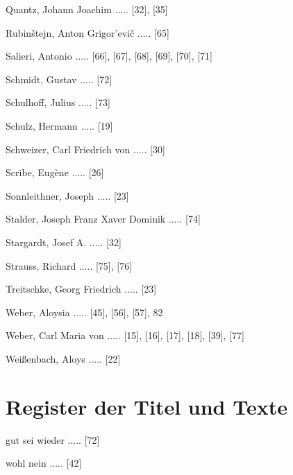 \documentclass[a4paper, twocolumn, 11pt]{book}
\begin{document}
\newline 
Quantz, Johann Joachim ..... [32], [35]

\newline 
Rubinštejn, Anton Grigor'evič ..... [65]

\newline 
Salieri, Antonio ..... [66], [67], [68], [69], [70], [71]

\newline 
Schmidt, Gustav ..... [72]

\newline 
Schulhoff, Julius ..... [73]

\newline 
Schulz, Hermann ..... [19]

\newline 
Schweizer, Carl Friedrich von ..... [30]

\newline 
Scribe, Eugène ..... [26]

\newline 
Sonnleithner, Joseph ..... [23]

\newline 
Stalder, Joseph Franz Xaver Dominik ..... [74]

\newline 
Stargardt, Josef A. ..... [32]

\newline 
Strauss, Richard ..... [75], [76]

\newline 
Treitschke, Georg Friedrich ..... [23]

\newline 
Weber, Aloysia ..... [45], [56], [57], 82

\newline 
Weber, Carl Maria von ..... [15], [16], [17], [18], [39], [77]

\newline 
Weißenbach, Aloys ..... [22]
    \clearpage  
    \chapter*{\centering Register der Titel und Texte}
\fancyhead{}


\newline 
[...] gut sei wieder ..... [72]

\newline 
[...] wohl nein ..... [42]
\end{document}
